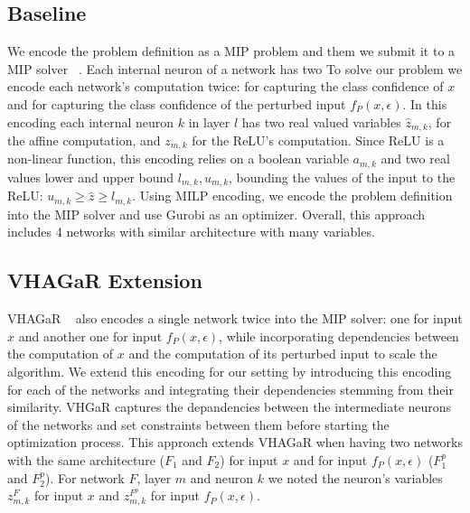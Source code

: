 \subsection{Baseline}
We encode the problem definition as a MIP problem and them we submit it to a MIP solver ~\cite{MIPVERIFY}.
Each internal neuron of a network has two 
To solve our problem we encode each network's computation twice: for capturing the class confidence of $x$ and for capturing the class confidence of the perturbed input $f_P(x,\epsilon)$. In this encoding each internal neuron $k$ in layer $l$ has two real valued variables $\hat{z}_{m,k}$, for the affine computation, and ${z}_{m,k}$ for the ReLU's computation. Since ReLU is a non-linear function, this encoding relies on a boolean variable $a_{m,k}$ and two real values lower and upper bound $l_{m,k},u_{m,k}$, bounding the values of the input to the ReLU: $u_{m,k}\geq{\hat{z}}\geq{l_{m,k}}$. Using MILP encoding, we encode the problem definition into the MIP solver and use Gurobi as an optimizer.
Overall, this approach includes 4 networks with similar architecture with many variables.

\subsection{VHAGaR Extension}
VHAGaR ~\cite{VHAGAR} also encodes a single network twice into the MIP solver: one for input $x$ and another one for input $f_P(x,\epsilon)$, while incorporating dependencies between the computation of $x$ and the computation of its perturbed input to scale the algorithm.
We extend this encoding for our setting by introducing this encoding for each of the networks and integrating their dependencies stemming from their similarity. VHGaR captures the depandencies between the intermediate neurons of the networks and set constraints between them before starting the optimization process. This approach extends VHAGaR when having two networks with the same architecture ($F_1$ and $F_2$) for input $x$ and for input $f_P(x,\epsilon)$ ($F^p_1$ and $F^p_2$). For network $F$, layer $m$ and neuron $k$ we noted the neuron's variables $z^F_{m,k}$ for input $x$ and $z^{F^p}_{m,k}$ for input $f_P(x,\epsilon)$.


